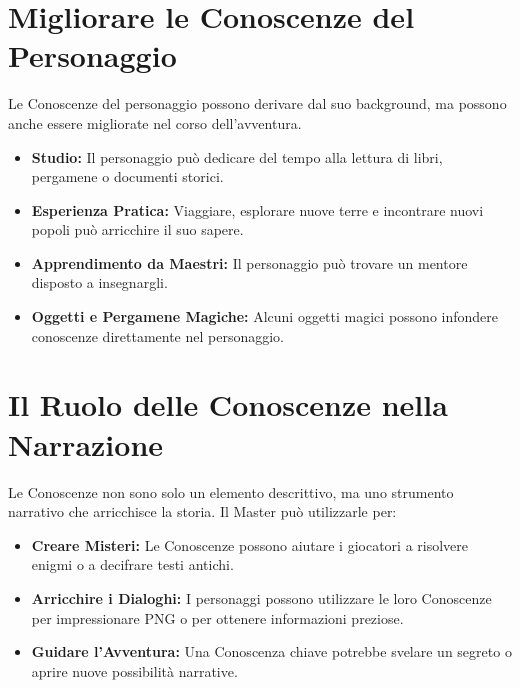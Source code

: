 \documentclass[../manuale_main.tex]{subfiles}
\begin{document}
\vspace{0.3cm}

\section*{Migliorare le Conoscenze del Personaggio}
Le Conoscenze del personaggio possono derivare dal suo background, ma possono anche essere migliorate nel corso dell’avventura.

\begin{itemize}
    \item \textbf{Studio:} Il personaggio può dedicare del tempo alla lettura di libri, pergamene o documenti storici.
    
    \item \textbf{Esperienza Pratica:} Viaggiare, esplorare nuove terre e incontrare nuovi popoli può arricchire il suo sapere.
    
    \item \textbf{Apprendimento da Maestri:} Il personaggio può trovare un mentore disposto a insegnargli.
    
    \item \textbf{Oggetti e Pergamene Magiche:} Alcuni oggetti magici possono infondere conoscenze direttamente nel personaggio.
\end{itemize}

\vspace{0.3cm}

\section*{Il Ruolo delle Conoscenze nella Narrazione}
Le Conoscenze non sono solo un elemento descrittivo, ma uno strumento narrativo che arricchisce la storia. Il Master può utilizzarle per:

\begin{itemize}
    \item \textbf{Creare Misteri:} Le Conoscenze possono aiutare i giocatori a risolvere enigmi o a decifrare testi antichi.
    \item \textbf{Arricchire i Dialoghi:} I personaggi possono utilizzare le loro Conoscenze per impressionare PNG o per ottenere informazioni preziose.
    \item \textbf{Guidare l'Avventura:} Una Conoscenza chiave potrebbe svelare un segreto o aprire nuove possibilità narrative.
\end{itemize}
\end{document}
